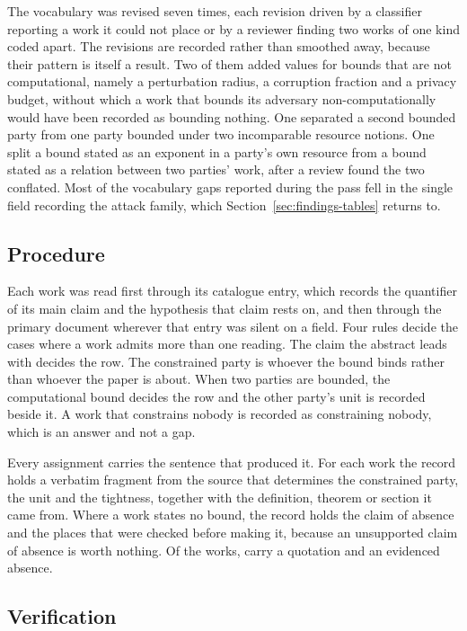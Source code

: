 The vocabulary was revised seven times, each revision driven by a classifier
reporting a work it could not place or by a reviewer finding two works of one kind
coded apart. The revisions are recorded rather than smoothed away, because their
pattern is itself a result. Two of them added values for bounds that are not
computational, namely a perturbation radius, a corruption fraction and a privacy
budget, without which a work that bounds its adversary non-computationally would
have been recorded as bounding nothing. One separated a second bounded party from
one party bounded under two incomparable resource notions. One split a bound stated
as an exponent in a party's own resource from a bound stated as a relation between
two parties' work, after a review found the two conflated. Most of the vocabulary
gaps reported during the pass fell in the single field recording the attack family,
which Section~\ref{sec:findings-tables} returns to.

\subsection{Procedure}

Each work was read first through its catalogue entry, which records the quantifier
of its main claim and the hypothesis that claim rests on, and then through the
primary document wherever that entry was silent on a field. Four rules decide the
cases where a work admits more than one reading. The claim the abstract leads with
decides the row. The constrained party is whoever the bound binds rather than
whoever the paper is about. When two parties are bounded, the computational bound
decides the row and the other party's unit is recorded beside it. A work that
constrains nobody is recorded as constraining nobody, which is an answer and not a
gap.

Every assignment carries the sentence that produced it. For each work the record
holds a verbatim fragment from the source that determines the constrained party,
the unit and the tightness, together with the definition, theorem or section it
came from. Where a work states no bound, the record holds the claim of absence and
the places that were checked before making it, because an unsupported claim of
absence is worth nothing. Of the \NumSources{} works, \QuoteOnFile{} carry a
quotation and \QuoteAbsent{} an evidenced absence.

\subsection{Verification}

